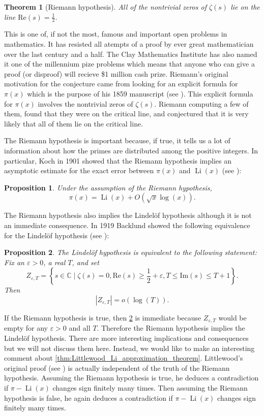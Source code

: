 \documentclass[12pt]{book}
\newtheorem{theorem}{Theorem}[section]
\newtheorem{proposition}{Proposition}[section]
\theoremstyle{definition}\newframedtheorem{method}{Method}
\newcommand{\C}{\mathbb{C}}
\newcommand{\z}{\zeta}
\newcommand{\e}{\varepsilon}
\newcommand{\<}{\langle}
\renewcommand{\>}{\rangle}
\DeclareMathOperator{\Li}{\mathrm{Li}}
\renewcommand{\Re}{\mathrm{Re}}
\renewcommand{\Im}{\mathrm{Im}}
\begin{document}
    \begin{theorem}[Riemann hypothesis]
      All of the nontrivial zeros of $\z(s)$ lie on the line $\Re(s) = \frac{1}{2}$.
    \end{theorem}

    This is one of, if not the most, famous and important open problems in mathematics. It has resisted all atempts of a proof by ever great mathematician over the last century and a half. The Clay Mathematics Institute has also named it one of the millennium pize problems which means that anyone who can give a proof (or disproof) will recieve \$1 million cash prize. Riemann's original motivation for the conjecture came from looking for an explicit formula for $\pi(x)$ which is the purpose of his 1859 manuscript (see \cite{riemann1859ueber}). This explicit formula for $\pi(x)$ involves the nontrivial zeros of $\z(s)$. Riemann computing a few of them, found that they were on the critical line, and conjectured that it is very likely that all of them lie on the critical line.

    The Riemann hypothesis is important because, if true, it tells us a lot of information about how the primes are distributed among the positive integers. In particular, Koch in 1901 showed that the Riemann hypothesis implies an asymptotic estimate for the exact error between $\pi(x)$ and $\Li(x)$ (see \cite{von1901distribution}):

    \begin{proposition}
      Under the assumption of the Riemann hypothesis,
      \[
        \pi(x) = \Li(x)+O(\sqrt{x}\log(x)).
      \]
    \end{proposition}

    The Riemann hypothesis also implies the Lindel\"of hypothesis although it is not an immediate consequence. In 1919 Backlund showed the following equivalence for the Lindel\"of hypothesis (see \cite{backlund1919beziehung}):

    \begin{proposition}\label{prop:Lindelof_hypothesis_equivalence}
      The Lindel\"of hypothesis is equivalent to the following statement: Fix an $\e > 0$, a real $T$, and set
      \[
        Z_{\e,T} = \left\{s \in \C \mid \z(s) = 0, \Re(s) \ge \frac{1}{2}+\e, T \le \Im(s) \le T+1 \right\}.
      \]
      Then
      \[
        |Z_{\e,T}| = o(\log(T)).
      \]
    \end{proposition}

    If the Riemann hypothesis is true, then \cref{prop:Lindelof_hypothesis_equivalence} is immediate because $Z_{\e,T}$ would be empty for any $\e > 0$ and all $T$. Therefore the Riemann hypothesis implies the Lindel\"of hypothesis. There are more interesting implications and consequences but we will not discuss them here. Instead, we would like to make an interesting comment about \cref{thm:Littlewood_Li_approximation_theorem}. Littlewood's original proof (see \cite{littlewood1914distribution}) is actually independent of the truth of the Riemann hypothesis. Assuming the Riemann hypothesis is true, he deduces a contradiction if $\pi-\Li(x)$ changes sign finitely many times. Then assuming the Riemann hypothesis is false, he again deduces a contradiction if $\pi-\Li(x)$ changes sign finitely many times.
\end{document}
